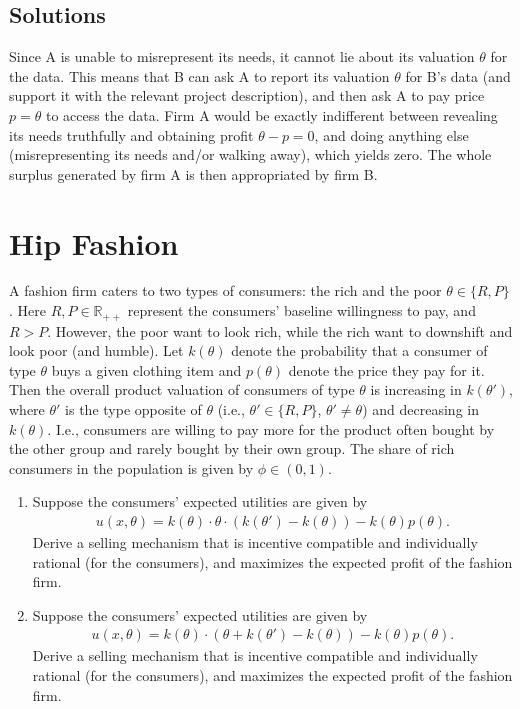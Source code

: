 \documentclass[a4paper]{article}
\begin{document}
\subsection*{Solutions}
Since A is unable to misrepresent its needs, it cannot lie about its valuation $\theta$ for the data. This means that B can ask A to report its valuation $\theta$ for B's data (and support it with the relevant project description), and then ask A to pay price $p=\theta$ to access the data. Firm A would be exactly indifferent between revealing its needs truthfully and obtaining profit $\theta-p=0$, and doing anything else (misrepresenting its needs and/or walking away), which yields zero. The whole surplus generated by firm A is then appropriated by firm B.
\fi 




\section{Hip Fashion}

A fashion firm caters to two types of consumers: the rich and the poor $\theta \in \{R,P\}$. Here $R,P \in \mathbb{R}_{++}$ represent the consumers' baseline willingness to pay, and $R>P$. However, the poor want to look rich, while the rich want to downshift and look poor (and humble). Let $k(\theta)$ denote the probability that a consumer of type $\theta$ buys a given clothing item and $p(\theta)$ denote the price they pay for it. Then the overall product valuation of consumers of type $\theta$ is increasing in $k(\theta')$, where $\theta'$ is the type opposite of $\theta$ (i.e., $\theta' \in \{R,P\}$, $\theta' \neq \theta$) and decreasing in $k(\theta)$. I.e., consumers are willing to pay more for the product often bought by the other group and rarely bought by their own group. 
The share of rich consumers in the population is given by $\phi \in (0,1)$. 

\begin{enumerate}
	\item Suppose the consumers' expected utilities are given by
	\begin{align*}
		u(x,\theta) = k(\theta) \cdot \theta \cdot \left( k(\theta')-k(\theta) \right) - k(\theta)p(\theta).
	\end{align*} 
	Derive a selling mechanism that is incentive compatible and individually rational (for the consumers), and maximizes the expected profit of the fashion firm.
	
	\item Suppose the consumers' expected utilities are given by
	\begin{align*}
		u(x,\theta) = k(\theta) \cdot \left( \theta + k(\theta')-k(\theta) \right) - k(\theta)p(\theta).
	\end{align*} 
	Derive a selling mechanism that is incentive compatible and individually rational (for the consumers), and maximizes the expected profit of the fashion firm.
\end{enumerate}
\end{document}
